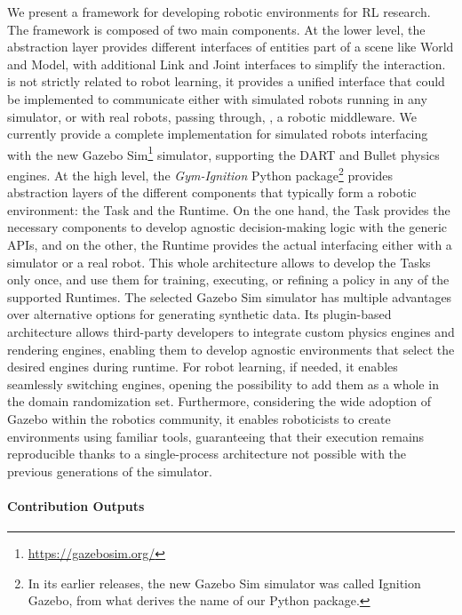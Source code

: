We present a framework for developing robotic environments for \acl{RL} research.
The framework is composed of two main components.
At the lower level, the \scenario \cpp abstraction layer provides different interfaces of entities part of a scene like World and Model, with additional Link and Joint interfaces to simplify the interaction.
\scenario is not strictly related to robot learning, it provides a unified interface that could be implemented to communicate either with simulated robots running in any simulator, or with real robots, passing through, \eg, a robotic middleware.
We currently provide a complete implementation for simulated robots interfacing with the new Gazebo Sim\footnote{\url{https://gazebosim.org/}} simulator, supporting the DART and Bullet physics engines.
At the high level, the \emph{Gym-Ignition} Python package\footnote{In its earlier releases, the new Gazebo Sim simulator was called Ignition Gazebo, from what derives the name of our Python package.} provides abstraction layers of the different components that typically form a robotic environment: the Task and the Runtime.
On the one hand, the Task provides the necessary components to develop agnostic decision-making logic with the generic \scenario \acp{API}, and on the other, the Runtime provides the actual interfacing either with a simulator or a real robot.
This whole architecture allows to develop the Tasks only once, and use them for training, executing, or refining a policy in any of the supported Runtimes.
The selected Gazebo Sim simulator has multiple advantages over alternative options for generating synthetic data.
Its plugin-based architecture allows third-party developers to integrate custom physics engines and rendering engines, enabling them to develop agnostic environments that select the desired engines during runtime.
For robot learning, if needed, it enables seamlessly switching engines, opening the possibility to add them as a whole in the domain randomization set.
Furthermore, considering the wide adoption of Gazebo within the robotics community, it enables roboticists to create environments using familiar tools, guaranteeing that their execution remains reproducible thanks to a single-process architecture not possible with the previous generations of the simulator.

\paragraph{Contribution Outputs}

